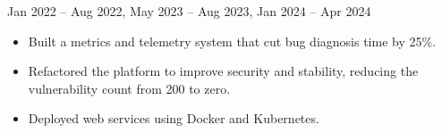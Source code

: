   {Jan 2022 -- Aug 2022, May 2023 -- Aug 2023, Jan 2024 -- Apr 2024}
\begin{itemize}
  \item Built a metrics and telemetry system that cut bug diagnosis time by 25\%.
  \item Refactored the platform to improve security and stability, reducing the vulnerability count from 200 to zero.
  \item Deployed web services using Docker and Kubernetes.
\end{itemize}
